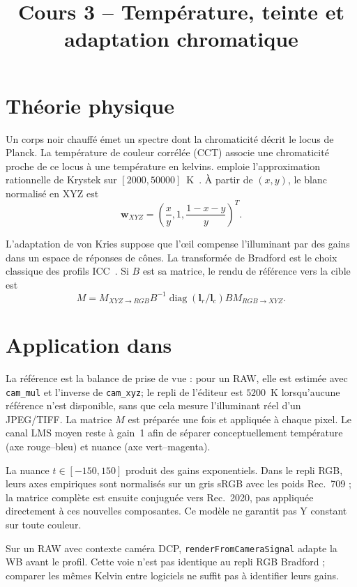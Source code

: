 
\title{Cours 3 -- Température, teinte et adaptation chromatique}


\section{Théorie physique}
Un corps noir chauffé émet un spectre dont la chromaticité décrit le locus de Planck. La température de couleur corrélée (CCT) associe une chromaticité proche de ce locus à une température en kelvins. \IPR{} emploie l'approximation rationnelle de Krystek sur $[2000,50000]$~K~\cite{krystek1985}. À partir de $(x,y)$, le blanc normalisé en XYZ est
\begin{equation}
\mathbf{w}_{XYZ}=\left(\frac{x}{y},1,\frac{1-x-y}{y}\right)^T.
\end{equation}

L'adaptation de von Kries suppose que l'œil compense l'illuminant par des gains dans un espace de réponses de cônes. La transformée de Bradford est le choix classique des profils ICC~\cite{lam1985,icc2022}. Si $B$ est sa matrice, le rendu de référence vers la cible est
\begin{equation}
M=M_{XYZ\to RGB}B^{-1}\operatorname{diag}(\mathbf{l}_r/\mathbf{l}_c)B M_{RGB\to XYZ}.
\end{equation}

\section{Application dans \IPR{}}
La référence est la balance de prise de vue : pour un RAW, elle est estimée avec \texttt{cam\_mul} et l'inverse de \texttt{cam\_xyz}; le repli de l'éditeur est $5200$~K lorsqu'aucune référence n'est disponible, sans que cela mesure l'illuminant réel d'un JPEG/TIFF. La matrice $M$ est préparée une fois et appliquée à chaque pixel. Le canal LMS moyen reste à gain~1 afin de séparer conceptuellement température (axe rouge--bleu) et nuance (axe vert--magenta).

La nuance $t\in[-150,150]$ produit des gains exponentiels. Dans le repli RGB, leurs axes empiriques sont normalisés sur un gris sRGB avec les poids Rec.~709 ; la matrice complète est ensuite conjuguée vers Rec.~2020, pas appliquée directement à ces nouvelles composantes. Ce modèle ne garantit pas Y constant sur toute couleur.

Sur un RAW avec contexte caméra DCP, \texttt{renderFromCameraSignal} adapte la WB avant le profil. Cette voie n'est pas identique au repli RGB Bradford ; comparer les mêmes Kelvin entre logiciels ne suffit pas à identifier leurs gains.

